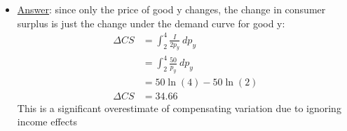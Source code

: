 \documentclass{article}
\begin{document}
\begin{itemize}
  \begin{itemize}
    \item  \underline{Answer}: since only the price of good y changes, the change in consumer surplus is just the change under the demand curve for good y:
    \begin{align*}
      \Delta CS &= \int_{2}^{4} \frac{I}{2p_{y}} \ d p_{y} \\
      &= \int_{2}^{4} \frac{50}{p_{y}} \ d p_{y} \\
      &= 50 \ln(4) - 50 \ln(2) \\
      \Delta CS &= 34.66
    \end{align*}
    This is a significant overestimate of compensating variation due to ignoring income effects
  \end{itemize}
\end{itemize}
\par
\vspace{6mm}
\end{document}
